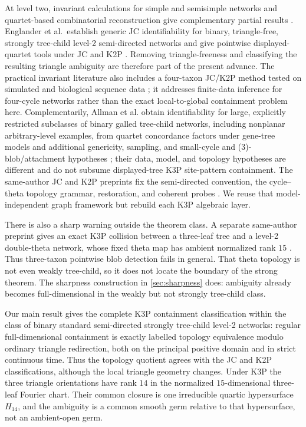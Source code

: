 At level two, invariant calculations for
simple and semisimple networks and quartet-based combinatorial reconstruction
give complementary partial results
\cite{Ardiyansyah2021,HoltgrefeEtAl2025Quartets}.  Englander et
al.~establish generic JC identifiability for binary, triangle-free, strongly
tree-child level-2 semi-directed networks and give pointwise
displayed-quartet tools under JC and K2P
\cite{EnglanderEtAl2026}.  Removing triangle-freeness and classifying the
resulting triangle ambiguity are therefore part of the present advance.  The
practical invariant literature also includes a four-taxon JC/K2P method tested
on simulated and biological sequence data \cite{MartinEtAl2026}; it addresses
finite-data inference for four-cycle networks rather than the exact
local-to-global containment problem here.  Complementarily, Allman et al.
obtain identifiability for large, explicitly restricted subclasses of binary
galled tree-child networks, including nonplanar arbitrary-level examples,
from quartet concordance factors under gene-tree models and additional
genericity, sampling, and small-cycle and (3)-blob/attachment hypotheses
\cite{AllmanEtAl2025}; their
data, model, and topology hypotheses are different and do not subsume
displayed-tree K3P site-pattern containment.  The same-author JC and K2P
preprints fix the semi-directed convention, the cycle--theta topology
grammar, restoration, and coherent probes
\cite{KriebelJC2026,KriebelK2P2026}.  We reuse that model-independent graph
framework but rebuild each K3P algebraic layer.

There is also a sharp warning outside the theorem class.  A separate
same-author preprint gives an exact K3P collision between a
three-leaf tree and a level-2 double-theta network, whose fixed theta map has
ambient normalized rank \(15\) \cite{KriebelTreeTheta2026}.  Thus three-taxon
pointwise blob detection fails in general.  That theta topology is not even
weakly tree-child, so it does not locate the boundary of the strong theorem.
The sharpness construction in \cref{sec:sharpness} does: ambiguity already
becomes full-dimensional in the weakly but not strongly tree-child class.

Our main result gives the complete K3P containment classification within the
class of binary standard semi-directed strongly tree-child level-2 networks:
regular full-dimensional containment is exactly labelled topology equivalence modulo
ordinary triangle redirection, both on the principal positive domain and in
strict continuous time.  Thus the topology quotient agrees with the JC and
K2P classifications, although the local triangle geometry changes.  Under
K3P the three triangle orientations have rank
\(14\) in the normalized \(15\)-dimensional three-leaf Fourier chart.  Their
common closure is one irreducible quartic hypersurface \(H_{14}\), and the
ambiguity is a common smooth germ relative to that hypersurface, not an
ambient-open germ.

